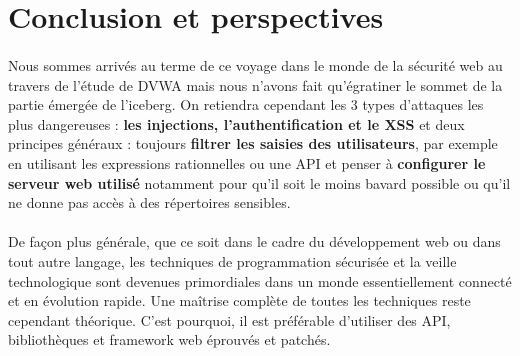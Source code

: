 \section{Conclusion et perspectives}

\paragraph{} Nous sommes arrivés au terme de ce voyage dans le monde de la sécurité web au travers de l'étude de DVWA mais nous n'avons fait qu'égratiner le sommet de la partie émergée de l'iceberg. On retiendra cependant les 3 types d'attaques les plus dangereuses : \textbf{ les injections, l'authentification et le XSS} et deux principes généraux : toujours \textbf{filtrer les saisies des utilisateurs}, par exemple en utilisant les expressions rationnelles ou une API et penser à \textbf{configurer le serveur web utilisé} notamment pour qu'il soit le moins bavard possible ou qu'il ne donne pas accès à des répertoires sensibles.  

\paragraph{} De façon plus générale, que ce soit dans le cadre du développement web ou dans tout autre langage, les techniques de programmation sécurisée et la veille technologique sont devenues primordiales dans un monde essentiellement connecté et en évolution rapide. Une maîtrise complète de toutes les techniques reste cependant théorique. C'est pourquoi, il est préférable d'utiliser des API, bibliothèques et framework web éprouvés et patchés.

